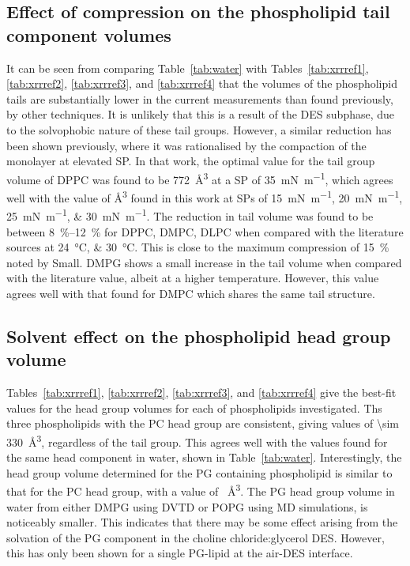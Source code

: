 \subsection{Effect of compression on the phospholipid tail component volumes}
It can be seen from comparing Table~\ref{tab:water} with Tables~\ref{tab:xrrref1}, \ref{tab:xrrref2}, \ref{tab:xrrref3}, and \ref{tab:xrrref4} that the volumes of the phospholipid tails are substantially lower in the current measurements than found previously, by other techniques.
It is unlikely that this is a result of the DES subphase, due to the solvophobic nature of these tail groups.
However, a similar reduction has been shown previously,\autocite{campbell_structure_2018} where it was rationalised by the compaction of the monolayer at elevated SP.
In that work, the optimal value for the tail group volume of DPPC was found to be \SI{772}{\angstrom\cubed} at a SP of \SI{35}{\milli\newton\per\meter}, which agrees well with the value of \si{\angstrom\cubed} found in this work at SPs of \SIlist{15;20;25;30}{\milli\newton\per\meter}.
The reduction in tail volume was found to be between \SIrange{8}{12}{\percent} for DPPC, DMPC, DLPC when compared with the literature sources at \SIlist{24;30}{\celsius}.
This is close to the maximum compression of \SI{15}{\percent} noted by Small.\autocite{small_lateral_1984}
DMPG shows a small increase in the tail volume when compared with the literature value, albeit at a higher temperature.
However, this value agrees well with that found for DMPC which shares the same tail structure.

\subsection{Solvent effect on the phospholipid head group volume}
Tables~\ref{tab:xrrref1}, \ref{tab:xrrref2}, \ref{tab:xrrref3}, and \ref{tab:xrrref4} give the best-fit values for the head group volumes for each of phospholipids investigated.
Ths three phospholipids with the PC head group are consistent, giving values of \SI{\sim 330}{\angstrom\cubed}, regardless of the tail group.
This agrees well with the values found for the same head component in water, shown in Table~\ref{tab:water}.
Interestingly, the head group volume determined for the PG containing phospholipid is similar to that for the PC head group, with a value of ~\si{\angstrom\cubed}.
The PG head group volume in water from either DMPG using DVTD\autocite{pan_molecular_2012} or POPG using MD simulations,\autocite{kucerka_scattering_2012} is noticeably smaller.
This indicates that there may be some effect arising from the solvation of the PG component in the choline chloride:glycerol DES.
However, this has only been shown for a single PG-lipid at the air-DES interface.

